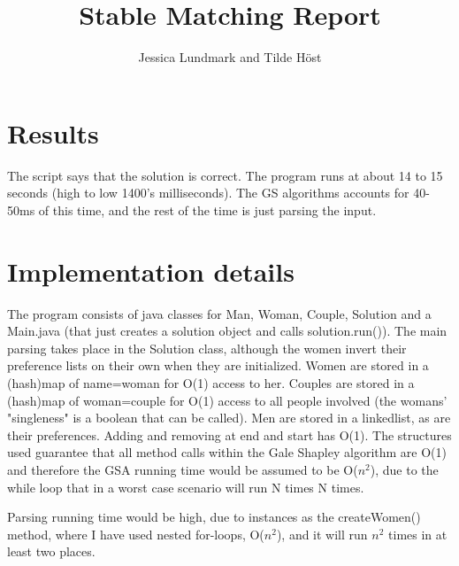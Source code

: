 \documentclass{article}
\title{Stable Matching Report}
\author{Jessica Lundmark and Tilde Höst}
\begin{document}
  \maketitle

  \section{Results}

  The script says that the solution is correct. The program runs at about 14 to 15 seconds (high to low 1400's milliseconds). The GS algorithms accounts for 40-50ms of this time, and the rest of the time is just parsing the input.

  \section{Implementation details}

  
  The program consists of java classes for Man, Woman, Couple, Solution and a Main.java (that just creates a solution object and calls solution.run()). The main parsing takes place in the Solution class, although the women invert their preference lists on their own when they are initialized. 
  \newline
  Women are stored in a (hash)map of name=woman for O(1) access to her.
  Couples are stored in a (hash)map of woman=couple for O(1) access to all people involved (the womans' "singleness" is a boolean that can be called).
  Men are stored in a linkedlist, as are their preferences. Adding and removing at end and start has O(1). 
The structures used guarantee that all method calls within the Gale Shapley algorithm are O(1) and therefore the GSA running time would be assumed to be O($n^2$), due to the while loop that in a worst case scenario will run N times N times.
  
  Parsing running time would be high, due to instances as the createWomen() method, where I have used nested for-loops, O($n^2$), and it will run $n^2$ times in at least two places.
  
  
\end{document}
